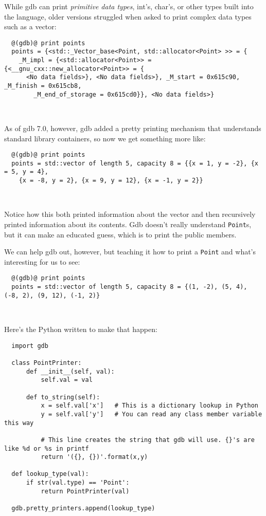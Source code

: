 \documentclass{article}
\begin{document}
While gdb can print \emph{primitive data types}, int's, char's, or other
types built into the language, older versions struggled when asked to print
complex data types such as a vector:

\begin{lstlisting}
  @(gdb)@ print points
  points = {<std::_Vector_base<Point, std::allocator<Point> >> = {
    _M_impl = {<std::allocator<Point>> = {<__gnu_cxx::new_allocator<Point>> = {
      <No data fields>}, <No data fields>}, _M_start = 0x615c90, _M_finish = 0x615cb8,
        _M_end_of_storage = 0x615cd0}}, <No data fields>}
\end{lstlisting}
~

As of gdb 7.0, however, gdb added a pretty printing mechanism that understands
standard library containers, so now we get something more like:

\begin{lstlisting}
  @(gdb)@ print points
  points = std::vector of length 5, capacity 8 = {{x = 1, y = -2}, {x = 5, y = 4},
    {x = -8, y = 2}, {x = 9, y = 12}, {x = -1, y = 2}}
\end{lstlisting}
~

Notice how this both printed information about the vector and then recursively
printed information about its contents. Gdb doesn't really understand
\texttt{Point}s, but it can make an educated guess, which is to print the
public members.

We can help gdb out, however, but teaching it how to print a \texttt{Point}
and what's interesting for us to see:

\begin{lstlisting}
  @(gdb)@ print points
  points = std::vector of length 5, capacity 8 = {(1, -2), (5, 4), (-8, 2), (9, 12), (-1, 2)}
\end{lstlisting}
~

Here's the Python written to make that happen:
\begin{lstlisting}
  import gdb

  class PointPrinter:
      def __init__(self, val):
          self.val = val

      def to_string(self):
          x = self.val['x']   # This is a dictionary lookup in Python
          y = self.val['y']   # You can read any class member variable this way

          # This line creates the string that gdb will use. {}'s are like %d or %s in printf
          return '({}, {})'.format(x,y)

  def lookup_type(val):
      if str(val.type) == 'Point':
          return PointPrinter(val)

  gdb.pretty_printers.append(lookup_type)
\end{lstlisting}
~
\end{document}
